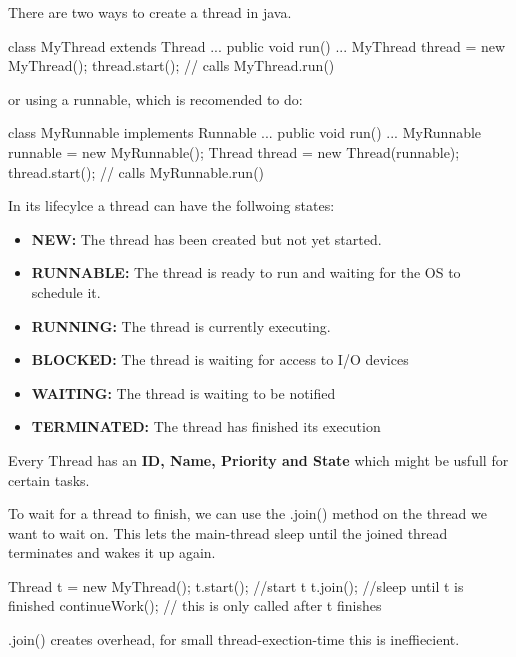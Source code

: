There are two ways to create a thread in java.

\begin{codeexample}
class MyThread extends Thread { ...
    public void run() {
        ...
    }
}
MyThread thread = new MyThread();
thread.start(); // calls MyThread.run()
\end{codeexample}

or using a runnable, which is recomended to do:

\begin{codeexample}
class MyRunnable implements Runnable { ...
    public void run() {
        ...
    }
}
MyRunnable runnable = new MyRunnable();
Thread thread = new Thread(runnable);
thread.start(); // calls MyRunnable.run()
\end{codeexample}

In its lifecylce a thread can have the follwoing states:
\begin{itemize}
    \item \textbf{NEW: }The thread has been created but not yet started.
    \item \textbf{RUNNABLE: }The thread is ready to run and waiting for the OS to schedule it.
    \item \textbf{RUNNING: }The thread is currently executing.
    \item \textbf{BLOCKED: }The thread is waiting for access to I/O devices
    \item \textbf{WAITING: }The thread is waiting to be notified
    \item \textbf{TERMINATED: }The thread has finished its execution
\end{itemize}

\begin{remark}
Every Thread has an \textbf{ID, Name, Priority and State} which might be usfull for certain tasks.            
\end{remark}

To wait for a thread to finish, we can use the .join() method on the thread we want to wait on. This lets
the main-thread sleep until the joined thread terminates and wakes it up again.

\begin{codeexample}
Thread t = new MyThread();
t.start(); //start t
t.join(); //sleep until t is finished
continueWork(); // this is only called after t finishes
\end{codeexample}

\begin{remark}
.join() creates overhead, for small thread-exection-time this is ineffiecient.
\end{remark}

